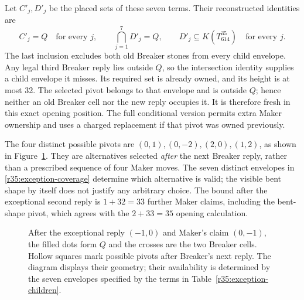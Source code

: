 Let \(C'_j,D'_j\) be the placed sets of these seven terms.  Their
reconstructed identities are
\begin{equation}\label{r35:exception-coverage}
 C'_j=Q\quad\text{for every }j,\qquad
 \bigcap_{j=1}^7D'_j=Q,\qquad
 D'_j\subseteq K(T_{614}^{35})\quad\text{for every }j.
\end{equation}
The last inclusion excludes both old Breaker stones from every child
envelope.  Any legal third Breaker reply lies outside \(Q\), so the
intersection identity supplies a child envelope it misses.  Its
required set is already owned, and its height is at most 32.  The
selected pivot belongs to that envelope and is outside \(Q\); hence
neither an old Breaker cell nor the new reply occupies it.  It is
therefore fresh in this exact opening position.  The full conditional
version permits extra Maker ownership and uses a charged replacement
if that pivot was owned previously.

The four distinct possible pivots are
\((0,1),(0,-2),(2,0),(1,2)\), as shown in
Figure~\ref{r35:bent-figure}.  They are alternatives selected
\emph{after} the next Breaker reply, rather than a prescribed sequence
of four Maker moves.  The seven distinct envelopes in
\eqref{r35:exception-coverage} determine which alternative is valid;
the visible bent shape by itself does not justify any arbitrary
choice.  The bound after the exceptional second reply is
\(1+32=33\) further Maker claims, including the bent-shape pivot,
which agrees with the \(2+33=35\) opening calculation.

\begin{figure}[tb]
\centering
{}
\caption{After the exceptional reply \((-1,0)\) and Maker's claim
\((0,-1)\), the filled dots form \(Q\) and the crosses are the two
Breaker cells.  Hollow squares mark possible pivots after Breaker's
next reply.  The diagram displays their geometry; their availability
is determined by the seven envelopes specified by the terms in
Table~\ref{r35:exception-children}.}
\label{r35:bent-figure}
\end{figure}
